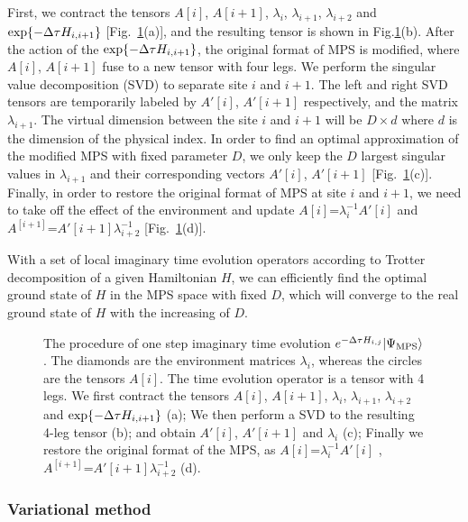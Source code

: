 \documentclass[preprint,3p,times,preprint,showpacs,amsmath,superscriptaddress,floatfix]{elsarticle}
\begin{document}
First, we contract the tensors $A[i]$, $A[i+1]$, $\lambda_i$, $\lambda_{i+1}$, $\lambda_{i+2}$ and ${\rm exp}\{-\Delta\tau H_{i,i+1}\}$ [Fig.~\ref{TEBD}(a)],
and the resulting tensor is shown in Fig.\ref{TEBD}(b).
After the action of the  ${\rm exp}\{-\Delta\tau H_{i,i+1}\}$, the original format of MPS is modified, where $A[i]$, $A[i+1]$ fuse to a new tensor with four legs.
We perform the singular value decomposition (SVD) to separate site $i$ and $i+1$.
The left and right SVD tensors are temporarily labeled by $A'[i]$, $A'[i+1]$ respectively, and the matrix $\lambda_{i+1}$.
The virtual dimension between the site $i$ and $i+1$ will be $D\times d$ where $d$ is the dimension of the physical index.
In order to find an optimal approximation of the modified MPS with fixed parameter $D$,
we only keep the $D$ largest singular values in $\lambda_{i+1}$ and their corresponding vectors $A'[i]$, $A'[i+1]$ [Fig.~\ref{TEBD}(c)].
%
Finally, in order to restore the original format of MPS  at site $i$ and $i+1$, we need to take off the effect of the environment and update
$A[i]$=$\lambda_i^{-1}A'[i]$ and $A^{[i+1]}$=$A'[i+1]\lambda_{i+2}^{-1}$ [Fig.~\ref{TEBD}(d)].

With a set of local imaginary time evolution operators according to Trotter decomposition of a given Hamiltonian $H$, we can efficiently find the optimal ground state of $H$ in the MPS space with fixed $D$, which will converge to the real ground state of $H$ with the increasing of $D$.

\begin{figure} [!hbp]
		\begin{center}
		\caption{The procedure of one step imaginary time evolution $e^{-\Delta\tau H_{i,j}}|\Psi_{\rm MPS}\rangle$\citep{Vidal2007}.
The diamonds are the environment matrices $\lambda_i$, whereas the circles are the tensors $A[i]$. The time evolution operator is a tensor with 4 legs.
We first contract the tensors $A[i]$, $A[i+1]$, $\lambda_i$, $\lambda_{i+1}$, $\lambda_{i+2}$ and ${\rm exp}\{-\Delta\tau H_{i,i+1}\}$ (a); We then perform
a SVD to the resulting 4-leg tensor (b); and obtain $A'[i]$, $A'[i+1]$ and $\lambda_i$ (c); Finally we restore the original format of the MPS,  as $A[i]$=$\lambda_i^{-1}A'[i]$ ,  $A^{[i+1]}$=$A'[i+1]\lambda_{i+2}^{-1}$ (d).   }\label{TEBD}
		\end{center}
\end{figure}

\subsubsection{Variational method}
\end{document}
